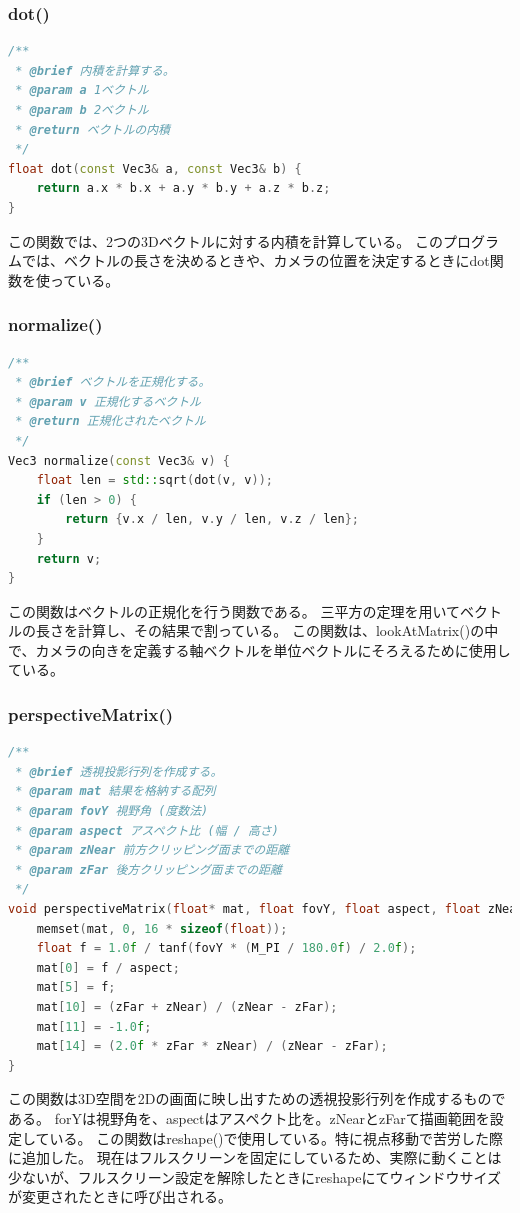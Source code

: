 \documentclass[uplatex,dvipdfmx,a4paper]{jsarticle}
\begin{document}
\hypertarget{func:dot}{}\subsubsection{dot()}\label{func:dot}
\begin{lstlisting}[language=C++, caption={dot() 関数 (3Dベクトル版)}, label={lst:dot_detail}]
/**
 * @brief 内積を計算する。
 * @param a 1ベクトル
 * @param b 2ベクトル
 * @return ベクトルの内積
 */
float dot(const Vec3& a, const Vec3& b) {
    return a.x * b.x + a.y * b.y + a.z * b.z;
}
\end{lstlisting}
この関数では、2つの3Dベクトルに対する内積を計算している。
このプログラムでは、ベクトルの長さを決めるときや、カメラの位置を決定するときにdot関数を使っている。

\hypertarget{func:normalize}{}\subsubsection{normalize()}\label{func:normalize}
\begin{lstlisting}[language=C++, caption={normalize() 関数}, label={lst:normalize_detail}]
/**
 * @brief ベクトルを正規化する。
 * @param v 正規化するベクトル
 * @return 正規化されたベクトル
 */
Vec3 normalize(const Vec3& v) {
    float len = std::sqrt(dot(v, v));
    if (len > 0) {
        return {v.x / len, v.y / len, v.z / len};
    }
    return v;
}
\end{lstlisting}
この関数はベクトルの正規化を行う関数である。
三平方の定理を用いてベクトルの長さを計算し、その結果で割っている。
この関数は、lookAtMatrix()の中で、カメラの向きを定義する軸ベクトルを単位ベクトルにそろえるために使用している。

\hypertarget{func:perspectiveMatrix}{}\subsubsection{perspectiveMatrix()}\label{func:perspectiveMatrix}
\begin{lstlisting}[language=C++, caption={perspectiveMatrix() 関数}, label={lst:perspectiveMatrix_detail}]
/**
 * @brief 透視投影行列を作成する。
 * @param mat 結果を格納する配列
 * @param fovY 視野角 (度数法)
 * @param aspect アスペクト比 (幅 / 高さ)
 * @param zNear 前方クリッピング面までの距離
 * @param zFar 後方クリッピング面までの距離
 */
void perspectiveMatrix(float* mat, float fovY, float aspect, float zNear, float zFar) {
    memset(mat, 0, 16 * sizeof(float));
    float f = 1.0f / tanf(fovY * (M_PI / 180.0f) / 2.0f);
    mat[0] = f / aspect;
    mat[5] = f;
    mat[10] = (zFar + zNear) / (zNear - zFar);
    mat[11] = -1.0f;
    mat[14] = (2.0f * zFar * zNear) / (zNear - zFar);
}
\end{lstlisting}
この関数は3D空間を2Dの画面に映し出すための透視投影行列を作成するものである。
forYは視野角を、aspectはアスペクト比を。zNearとzFarて描画範囲を設定している。
この関数はreshape()で使用している。特に視点移動で苦労した際に追加した。
現在はフルスクリーンを固定にしているため、実際に動くことは少ないが、フルスクリーン設定を解除したときにreshapeにてウィンドウサイズが変更されたときに呼び出される。
\end{document}
